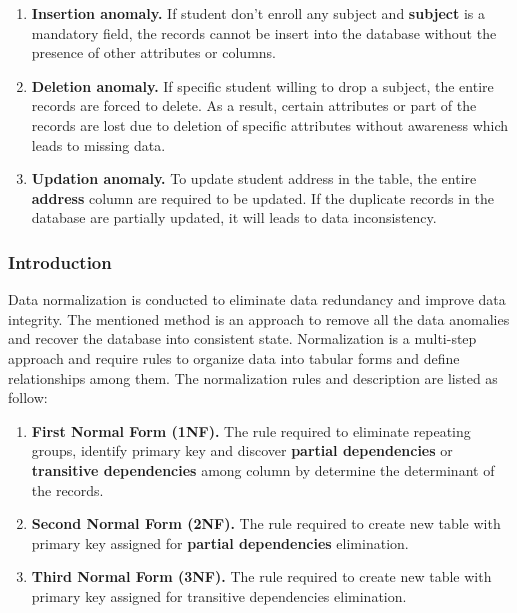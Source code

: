 \begin{enumerate}[topsep=0pt,itemsep=-1ex,partopsep=1ex,parsep=1.5ex]
	
	\item \textbf{Insertion anomaly.} If student don't enroll any subject and \textbf{subject} is a mandatory field, the records cannot be insert into the database without the presence of other attributes or columns. 
	\item \textbf{Deletion anomaly.} If specific student willing to drop a subject, the entire records are forced to delete. As a result, certain attributes or part of the records are lost due to deletion of specific attributes without awareness which leads to missing data.
	\item \textbf{Updation anomaly.} To update student address in the table, the entire \textbf{address} column are required to be updated. If the duplicate records in the database are partially updated, it will leads to data inconsistency. 
	
\end{enumerate}

\subsubsection{Introduction}

Data normalization is conducted to eliminate data redundancy and improve data integrity. The mentioned method is an approach to remove all the data anomalies and recover the database into consistent state. \cite{normalization-benefits} Normalization is a multi-step approach and require rules to organize data into tabular forms and define relationships among them. The normalization rules and description are listed as follow: 

\begin{enumerate}[topsep=0pt,itemsep=-1ex,partopsep=1ex,parsep=1.5ex]
	
	\item \textbf{First Normal Form (1NF).} The rule required to eliminate repeating groups, identify primary key and discover \textbf{partial dependencies} or \textbf{transitive dependencies} among column by determine the determinant of the records. 
	\item \textbf{Second Normal Form (2NF).} The rule required to create new table with primary key assigned for \textbf{partial dependencies} elimination. 
	\item \textbf{Third Normal Form (3NF).} The rule required to create new table with primary key assigned for transitive dependencies elimination. 
	
\end{enumerate}

